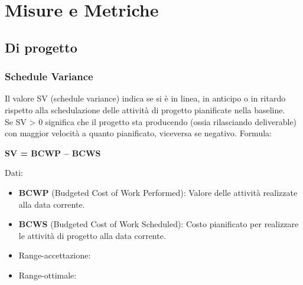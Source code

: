 \documentclass[a4paper,11pt]{article}
\begin{document}
\section{Misure e Metriche}
\label{Appendice B}
\subsection{Di progetto}
\subsubsection{Schedule Variance}
Il valore SV (schedule variance) indica se si è in linea, in anticipo o in ritardo rispetto alla schedulazione delle attività di progetto pianificate nella baseline.\\
Se SV > 0 significa che il progetto sta producendo (ossia rilasciando deliverable) con maggior velocità a quanto pianificato, viceversa se negativo.
Formula:
\begin{center}
\textbf{SV = BCWP – BCWS\\}
\end{center}
Dati:
\begin{itemize}
\item \textbf{BCWP} (Budgeted Cost of Work Performed): Valore delle attività realizzate alla data corrente.
\item \textbf{BCWS} (Budgeted Cost of Work Scheduled): Costo pianificato per realizzare le attività di progetto alla data corrente.
\end{itemize}
\begin{itemize}
	\item Range-accettazione: \begin{math} [ \ge -(PreventivoFase*5\%)]
	\end{math}
	\item Range-ottimale: \begin{math}[ \ge 0]\end{math}
	\end{itemize}
\end{document}
